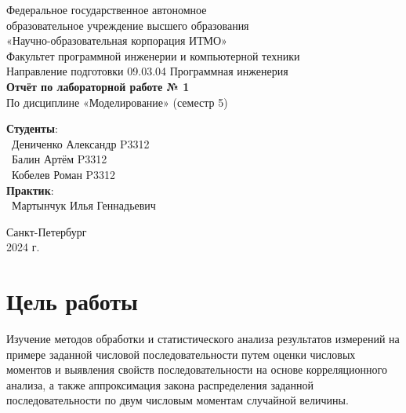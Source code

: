 \documentclass{article}
\begin{document}
\begin{center}
    \Large
    Федеральное государственное автономное \\
    образовательное учреждение высшего образования \\ 
    «Научно-образовательная корпорация ИТМО»\\
    \vspace{0.5cm}
    \large
    Факультет программной инженерии и компьютерной техники \\
    Направление подготовки 09.03.04 Программная инженерия \\
    \vspace{1cm}
    \Large
    \textbf{Отчёт по лабораторной работе № 1} \\
    По дисциплине «Моделирование» (семестр 5)\\
    \large
    \vspace{8cm}

    \begin{minipage}{.33\textwidth}
    \end{minipage}
    \hfill
    \begin{minipage}{.4\textwidth}
    
        \textbf{Студенты}: \vspace{.1cm} \\
        \ Дениченко Александр P3312\\
        \ Балин Артём P3312\\
        \ Кобелев Роман P3312\\
        \textbf{Практик}:  \\
        \ Мартынчук Илья Геннадьевич
    \end{minipage}
    \vfill
Санкт-Петербург\\ 2024 г.
\end{center}
\pagestyle{empty}
\newpage
\pagestyle{plain}

\section*{Цель работы}
Изучение методов обработки и статистического анализа результатов
измерений на примере заданной числовой последовательности путем оценки
числовых моментов и выявления свойств последовательности на основе
корреляционного анализа, а также аппроксимация закона распределения заданной
последовательности по двум числовым моментам случайной величины.
\end{document}

